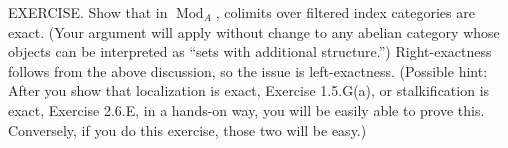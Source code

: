 EXERCISE. Show that in $\operatorname{Mod}_A$, colimits over filtered index categories are exact. (Your argument will apply without change to any abelian category whose objects can be interpreted as “sets with additional structure.”) Right-exactness follows from the above discussion, so the issue is left-exactness. (Possible hint: After you show that localization is exact, Exercise 1.5.G(a), or stalkification is exact, Exercise 2.6.E, in a hands-on way, you will be easily able to prove this. Conversely, if you do this exercise, those two will be easy.)
